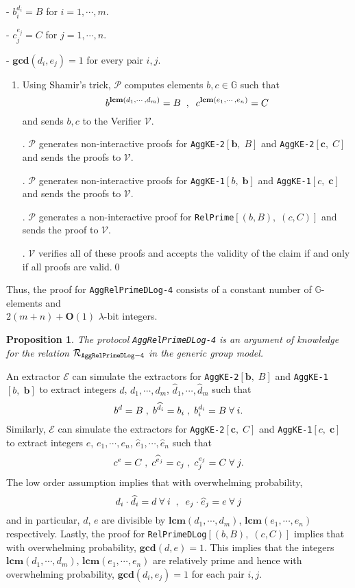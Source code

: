 \documentclass[11pt, lettersize, notitlepage, leqno, footskip=0.6cm]{article}
\newcommand{\mc}{\mathcal}
\newcommand{\mb}{\mathbb}
\newcommand{\mbf}{\mathbf}
\newcommand{\lam}{\lambda}
\newcommand{\what}{\widehat}
\newcommand{\bO}{\mbf{O}}
\newcommand{\mP}{\mc{P}}
\newcommand{\vs}{\vspace{-0.15cm}}
\newcommand{\noin}{\noindent}
\newcommand{\op}{overwhelming probability}
\newcommand{\LCM}{\mbf{lcm}}
\newcommand{\GCD}{\mbf{gcd}}
\newcommand{\E}{\mc{E}}
\newtheorem{Prop}[Thm]{Proposition}
\numberwithin{equation}{section}
\begin{document}
\noin - $b_i^{d_i} = B$ for $i = 1,\cdots, m$.

\noin - $c_j^{e_j} = C$ for $j = 1,\cdots, n$.

\noin - $\GCD(d_i, e_j) = 1$ for every pair $i, j$.

\begin{enumerate}[wide, labelwidth=!, labelindent=0pt] \item Using Shamir's trick, $\mP$ computes elements $b, c \in \mb{G}$ such that \vs $$b^{\LCM(d_1,\cdots,d_m)} = B\;\; , \;\; c^{\LCM(e_1,\cdots,e_n)} = C \vs $$ and sends $b,c$ to the Verifier $\mc{V}$.

\noin 2. $\mc{P}$ generates non-interactive proofs for \verb|AggKE-2|$[\mbf{b},\; B]$ and \verb|AggKE-2|$[\mbf{c},\; C]$ and sends the proofs to $\mc{V}$.

\noin 3. $\mc{P}$ generates non-interactive proofs for \verb|AggKE-1|$[b,\;\mbf{b}]$ and \verb|AggKE-1|$[c,\; \mbf{c}]$ and sends the proofs to $\mc{V}$.

\noin 4. $\mc{P}$ generates a non-interactive proof for \verb|RelPrime|$[(b,B),\;(c,C)]$ and sends the proof to $\mc{V}$.

\noin 5. $\mc{V}$ verifies all of these proofs and accepts the validity of the claim if and only if all proofs are valid.\qed \end{enumerate}

\noin Thus, the proof for \verb|AggRelPrimeDLog-4| consists of a constant number of $\mb{G}$-elements and \\$2(m+n)+\bO(1)$ $\lam$-bit integers.


\begin{Prop} The protocol \verb|AggRelPrimeDLog-4| is an argument of knowledge for the relation $\mc{R}_{\tt{AggRelPrimeDLog-4}}$ in the generic group model.\end{Prop}

\begin{prf} An extractor $\E$ can simulate the extractors for \verb|AggKE-2|$[\mbf{b},\; B]$ and \verb|AggKE-1|$[b,\;\mbf{b}]$ to extract integers $d$, $d_1,\cdots,d_m$, $\what{d}_1,\cdots,\what{d}_m$ such that \vs $$b^d = B\;,\; b^{\what{d}_i}= b_i\;,\; b_i^{d_i}= B\;\forall\; i. \vs $$ Similarly, $\E$ can simulate the extractors for \verb|AggKE-2|$[\mbf{c},\; C]$ and \verb|AggKE-1|$[c,\;\mbf{c}]$ to extract integers $e$, $e_1,\cdots,e_n$, $\what{e}_1,\cdots,\what{e}_n$ such that \vs $$c^e = C\;,\; c^{\what{e}_j}= c_j\;,\;c_j^{e_j}= C\;\forall\; j. \vs $$ The low order assumption implies that with \op,\vs $$d_i\cdot\what{d}_i = d\;\forall\;i\;\;,\;\; e_j\cdot\what{e}_j = e\;\forall\;j \vs $$ and in particular, $d$, $e$ are divisible by $\LCM(d_1,\cdots,d_m)$, $\LCM(e_1,\cdots,e_n)$ respectively. Lastly, the proof for \verb|RelPrimeDLog|$[(b,B),\;(c,C)]$ implies that with \op, $\GCD(d,e) = 1$. This implies that the integers $\LCM(d_1,\cdots,d_m)$, $\LCM(e_1,\cdots,e_n)$ are relatively prime and hence with \op, $\GCD(d_i,e_j) = 1$ for each pair $i,j$. \end{prf}
\end{document}
